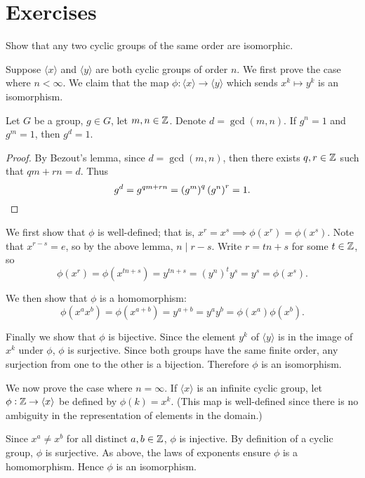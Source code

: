 \section*{Exercises}
\begin{exercise}
Show that any two cyclic groups of the same order are isomorphic.
\end{exercise}

\begin{solution}
Suppose $\langle x\rangle$ and $\langle y\rangle$ are both cyclic groups of order $n$. We first prove the case where $n<\infty$. We claim that the map $\phi:\langle x\rangle\to\langle y\rangle$ which sends $x^k\mapsto y^k$ is an isomorphism.
\begin{lemma*}
Let $G$ be a group, $g\in G$, let $m,n\in\mathbb Z$. Denote $d=\gcd(m,n)$. If $g^n=1$ and $g^m=1$, then $g^d=1$.
\end{lemma*}
\begin{proof}
By Bezout's lemma, since $d=\gcd(m,n)$, then there exists $q,r\in\mathbb Z$ such that $qm+rn=d$. Thus
\[g^d=g^{qm+rn}=\left(g^m\right)^q\left(g^n\right)^r=1.\]
\end{proof}
We first show that $\phi$ is well-defined; that is, $x^r=x^s\implies \phi(x^r)=\phi(x^s)$. Note that $x^{r-s}=e$, so by the above lemma, $n\mid r-s$. Write $r=tn+s$ for some $t\in\mathbb Z$, so
\[\phi(x^r)=\phi(x^{tn+s})=y^{tn+s}=(y^n)^ty^s=y^s=\phi(x^s).\]

We then show that $\phi$ is a homomorphism:
\[\phi(x^ax^b)=\phi(x^{a+b})=y^{a+b}=y^ay^b=\phi(x^a)\phi(x^b).\]

Finally we show that $\phi$ is bijective. Since the element $y^k$ of $\langle y\rangle$ is in the image of $x^k$ under $\phi$, $\phi$ is surjective. Since both groups have the same finite order, any surjection from one to the other is a bijection. Therefore $\phi$ is an isomorphism.

We now prove the case where $n=\infty$. If $\langle x\rangle$ is an infinite cyclic group, let $\phi:\mathbb Z\to\langle x\rangle$ be defined by $\phi(k)=x^k$. (This map is well-defined since there is no ambiguity in the representation of elements in the domain.)

Since $x^a\neq x^b$ for all distinct $a,b\in\mathbb Z$, $\phi$ is injective. By definition of a cyclic group, $\phi$ is surjective. As above, the laws of exponents ensure $\phi$ is a homomorphism. Hence $\phi$ is an isomorphism.
\end{solution}